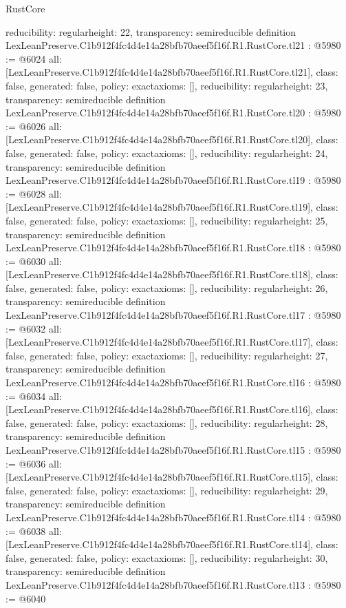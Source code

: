 \begin{lexlean}{RustCore}
\begin{coremodule}
{  reducibility: regular{height: 22},
  transparency: semireducible
}
definition LexLeanPreserve.C1b912f4fc4d4e14a28bfb70aeef5f16f.R1.RustCore.tl21 : @5980 := @6024 {
  all: [LexLeanPreserve.C1b912f4fc4d4e14a28bfb70aeef5f16f.R1.RustCore.tl21],
  class: false,
  generated: false,
  policy: exact{axioms: []},
  reducibility: regular{height: 23},
  transparency: semireducible
}
definition LexLeanPreserve.C1b912f4fc4d4e14a28bfb70aeef5f16f.R1.RustCore.tl20 : @5980 := @6026 {
  all: [LexLeanPreserve.C1b912f4fc4d4e14a28bfb70aeef5f16f.R1.RustCore.tl20],
  class: false,
  generated: false,
  policy: exact{axioms: []},
  reducibility: regular{height: 24},
  transparency: semireducible
}
definition LexLeanPreserve.C1b912f4fc4d4e14a28bfb70aeef5f16f.R1.RustCore.tl19 : @5980 := @6028 {
  all: [LexLeanPreserve.C1b912f4fc4d4e14a28bfb70aeef5f16f.R1.RustCore.tl19],
  class: false,
  generated: false,
  policy: exact{axioms: []},
  reducibility: regular{height: 25},
  transparency: semireducible
}
definition LexLeanPreserve.C1b912f4fc4d4e14a28bfb70aeef5f16f.R1.RustCore.tl18 : @5980 := @6030 {
  all: [LexLeanPreserve.C1b912f4fc4d4e14a28bfb70aeef5f16f.R1.RustCore.tl18],
  class: false,
  generated: false,
  policy: exact{axioms: []},
  reducibility: regular{height: 26},
  transparency: semireducible
}
definition LexLeanPreserve.C1b912f4fc4d4e14a28bfb70aeef5f16f.R1.RustCore.tl17 : @5980 := @6032 {
  all: [LexLeanPreserve.C1b912f4fc4d4e14a28bfb70aeef5f16f.R1.RustCore.tl17],
  class: false,
  generated: false,
  policy: exact{axioms: []},
  reducibility: regular{height: 27},
  transparency: semireducible
}
definition LexLeanPreserve.C1b912f4fc4d4e14a28bfb70aeef5f16f.R1.RustCore.tl16 : @5980 := @6034 {
  all: [LexLeanPreserve.C1b912f4fc4d4e14a28bfb70aeef5f16f.R1.RustCore.tl16],
  class: false,
  generated: false,
  policy: exact{axioms: []},
  reducibility: regular{height: 28},
  transparency: semireducible
}
definition LexLeanPreserve.C1b912f4fc4d4e14a28bfb70aeef5f16f.R1.RustCore.tl15 : @5980 := @6036 {
  all: [LexLeanPreserve.C1b912f4fc4d4e14a28bfb70aeef5f16f.R1.RustCore.tl15],
  class: false,
  generated: false,
  policy: exact{axioms: []},
  reducibility: regular{height: 29},
  transparency: semireducible
}
definition LexLeanPreserve.C1b912f4fc4d4e14a28bfb70aeef5f16f.R1.RustCore.tl14 : @5980 := @6038 {
  all: [LexLeanPreserve.C1b912f4fc4d4e14a28bfb70aeef5f16f.R1.RustCore.tl14],
  class: false,
  generated: false,
  policy: exact{axioms: []},
  reducibility: regular{height: 30},
  transparency: semireducible
}
definition LexLeanPreserve.C1b912f4fc4d4e14a28bfb70aeef5f16f.R1.RustCore.tl13 : @5980 := @6040 {
}
\end{coremodule}
\end{lexlean}
